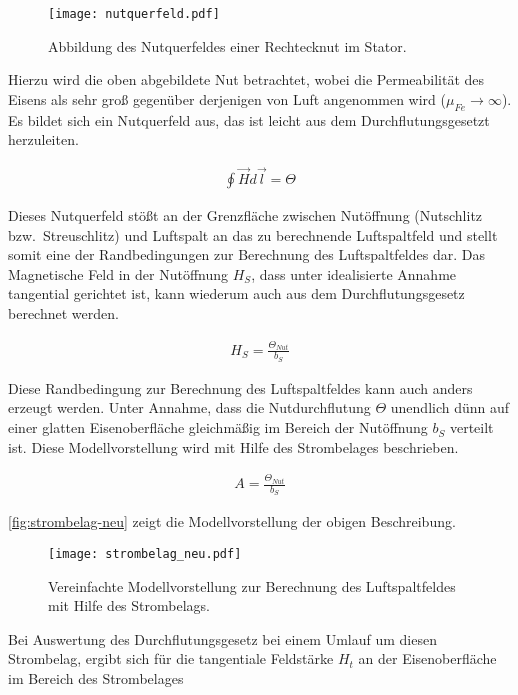 \begin{figure}[!htb]
\centering
\texttt{[image: nutquerfeld.pdf]}
\label{fig:nutquerfeld}
\caption{Abbildung des Nutquerfeldes einer Rechtecknut im Stator.}
\end{figure}

Hierzu wird die oben abgebildete Nut betrachtet, wobei die Permeabilität des Eisens als sehr groß gegenüber derjenigen von Luft angenommen wird ($\mu_{Fe} \rightarrow \infty$).
Es bildet sich ein Nutquerfeld aus, das ist leicht aus dem Durchflutungsgesetzt herzuleiten.

\begin{align}
\oint \vec{H}d\vec{l} = \Theta \label{eqn:durchflutungsgesetzt}
\end{align}

Dieses Nutquerfeld stößt an der Grenzfläche zwischen Nutöffnung (Nutschlitz bzw.\ Streuschlitz) und Luftspalt an das zu berechnende Luftspaltfeld und stellt somit eine der Randbedingungen zur Berechnung des Luftspaltfeldes dar.
Das Magnetische Feld in der Nutöffnung $H_{S}$, dass unter idealisierte Annahme tangential gerichtet ist, kann wiederum auch aus dem Durchflutungsgesetz berechnet werden.

\begin{align}
H_S = \frac{\Theta_{Nut}}{b_S}
\end{align}

Diese Randbedingung zur Berechnung des Luftspaltfeldes kann auch anders erzeugt werden.
Unter Annahme, dass die Nutdurchflutung $\Theta$ unendlich dünn auf einer glatten Eisenoberfläche gleichmäßig im Bereich der Nutöffnung $b_S$ verteilt ist.
Diese Modellvorstellung wird mit Hilfe des Strombelages beschrieben.

\begin{align}
A = \frac{\Theta_{Nut}}{b_S}
\end{align}

\autoref{fig:strombelag-neu} zeigt die Modellvorstellung der obigen Beschreibung.

\begin{figure}[!h]
\centering
\texttt{[image: strombelag\_neu.pdf]}
\label{fig:strombelag-neu}
\caption{Vereinfachte Modellvorstellung zur Berechnung des Luftspaltfeldes mit Hilfe des Strombelags.}
\end{figure}

Bei Auswertung des Durchflutungsgesetz bei einem Umlauf um diesen Strombelag, ergibt sich für die tangentiale Feldstärke $H_t$ an der Eisenoberfläche im Bereich des Strombelages

